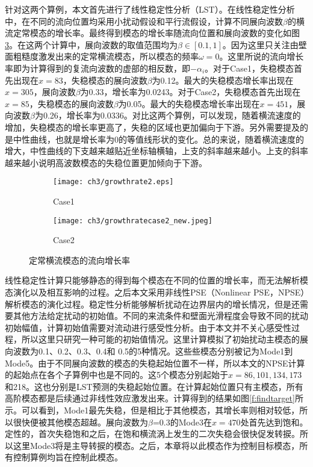 针对这两个算例，本文首先进行了线性稳定性分析（LST）。在线性稳定性分析中，在不同的流向位置均采用小扰动假设和平行流假设，计算不同展向波数$\beta$的横流定常模态的增长率。最终得到模态的增长率随流向位置和展向波数的变化如图\ref{f:LST}。在这两个计算中，展向波数的取值范围均为$\beta\in[0.1,1]$。因为这里只关注由壁面粗糙度激发出来的定常横流模态，所以模态的频率$\omega = 0$。这里所说的流向增长率即为计算得到的复流向波数的虚部的相反数，即$-\alpha_i$。对于Case1，失稳模态首先出现在$x = 83$，失稳模态的展向波数$\beta$为0.12。最大的失稳模态增长率出现在$x =305$，展向波数$\beta$为0.33，增长率为0.0243。对于Case2，失稳模态首先出现在$x = 85$，失稳模态的展向波数$\beta$为0.05。最大的失稳模态增长率出现在$x =451$，展向波数$\beta$为0.26，增长率为0.0336。对比这两个算例，可以发现，随着横流速度的增加，失稳模态的增长率更高了，失稳的区域也更加偏向于下游。另外需要提及的是中性曲线，也就是增长率为0的等值线形状的变化。总的来说，随着横流速度的增大，中性曲线的下支越来越贴近坐标轴横轴，上支的斜率越来越小。上支的斜率越来越小说明高波数模态的失稳位置更加倾向于下游。

\begin{figure}[htb]
  \centering
  \begin{subfigure}{0.48\linewidth}
    \texttt{[image: ch3/growthrate2.eps]}
    \caption{Case1}\label{modesenergycase3}
  \end{subfigure}
  \begin{subfigure}{0.48\linewidth}
    \texttt{[image: ch3/growthratecase2\_new.jpeg]}
    \caption{Case2}\label{modesenergycase1}
  \end{subfigure}
  \caption{定常横流模态的流向增长率}\label{f:LST}
\end{figure}

线性稳定性计算只能够静态的得到每个模态在不同的位置的增长率，而无法解析模态演化以及相互影响的过程。之后本文采用非线性PSE（Nonlinear PSE，NPSE）解析模态的演化过程。稳定性分析能够解析扰动在边界层内的增长情况，但是还需要其他方法给定扰动的初始值。不同的来流条件和壁面光滑程度会导致不同的扰动初始幅值，计算初始值需要对流动进行感受性分析。由于本文并不关心感受性过程，所以这里只研究一种可能的初始值情况。这里计算模拟了初始扰动主模态的展向波数为0.1、0.2、0.3、0.4和 0.5的5种情况。这些些模态分别被记为Mode1到Mode5。由于不同展向波数的模态的失稳起始位置不一样，所以本文的NPSE计算的起始点在各个子算例中也是不同的。这5个模态分别起始于$x=86,101,134,173$和218。这也分别是LST预测的失稳起始位置。在计算起始位置只有主模态，所有高阶模态都是后续通过非线性效应激发出来。计算得到的结果如图\ref{f:findtarget}所示。可以看到，Mode1最先失稳，但是相比于其他模态，其增长率则相对较低，所以很快便被其他模态超越。展向波数为$\beta$=0.3的Mode3在$x = 470$处首先达到饱和。定性的，首次失稳饱和之后，在饱和横流涡上发生的二次失稳会很快促发转捩。所以这里Mode3将是主导转捩的模态。之后，本章将以此模态作为控制目标模态，所有控制算例均旨在控制此模态。


